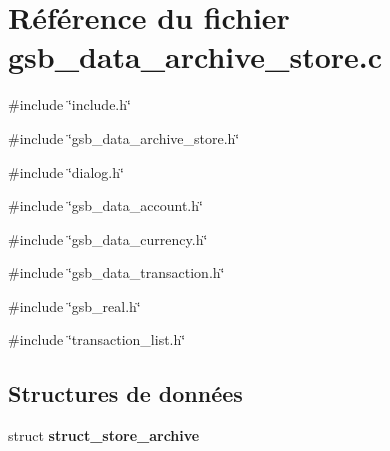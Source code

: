 \section{Référence du fichier gsb\_\-data\_\-archive\_\-store.c}
\label{gsb__data__archive__store_8c}
{\ttfamily \#include \char`\"{}include.h\char`\"{}}\par
{\ttfamily \#include \char`\"{}gsb\_\-data\_\-archive\_\-store.h\char`\"{}}\par
{\ttfamily \#include \char`\"{}dialog.h\char`\"{}}\par
{\ttfamily \#include \char`\"{}gsb\_\-data\_\-account.h\char`\"{}}\par
{\ttfamily \#include \char`\"{}gsb\_\-data\_\-currency.h\char`\"{}}\par
{\ttfamily \#include \char`\"{}gsb\_\-data\_\-transaction.h\char`\"{}}\par
{\ttfamily \#include \char`\"{}gsb\_\-real.h\char`\"{}}\par
{\ttfamily \#include \char`\"{}transaction\_\-list.h\char`\"{}}\par
\subsection*{Structures de données}
\begin{DoxyCompactItemize}
\item 
struct {\bf struct\_\-store\_\-archive}
\end{DoxyCompactItemize}

